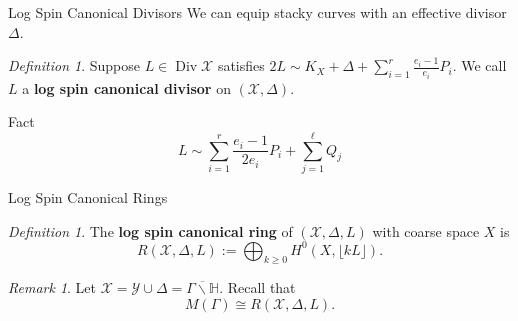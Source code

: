 \documentclass{beamer}
\theoremstyle{remark}
\newtheorem{rem}[thm]{Remark}
\newtheorem{defn}[thm]{Definition}
\newcommand\BH{{\mathbb H}}
\newcommand\BQ{{\mathbb Q}}
\newcommand \sx{{\mathscr X}}
\newcommand \sy{{\mathscr Y}}
\DeclareMathOperator\di{Div}
\newcommand{\halfcan}{L}
\begin{document}
\begin{frame}{Log Spin Canonical Divisors}
We can equip stacky curves with an effective divisor $\Delta$.





\begin{defn}
Suppose $\halfcan \in \di
\sx$ satisfies $2 \halfcan \sim K_X + \Delta + \sum_{i = 1}^{r}
\frac{e_i - 1}{e_i} P_i$.  We call $\halfcan$ a
\textbf{log spin canonical divisor} on $(\sx, \Delta)$.
\end{defn}

\begin{block}{Fact}
\[
	\halfcan \sim \sum_{i = 1}^{r} \frac{e_i - 1}{2e_i} P_i
	+ \sum_{j = 1}^{\ell} Q_j
\]
\end{block}

\end{frame}


\begin{frame}{Log Spin Canonical Rings}




\begin{defn}
The {\bf log spin canonical ring} of $(\sx, \Delta, \halfcan)$ with
coarse space $X$ is
\[
	R(\sx, \Delta, \halfcan) := \bigoplus_{k \geq 0} H^0(X, \lfloor k
	\halfcan \rfloor).
\]
\end{defn}

\begin{rem}
Let $\sx = \sy \cup \Delta = \overline{\Gamma \backslash \BH}$.
Recall that
\[
	M(\Gamma) \cong R(\sx, \Delta, \halfcan).
\]
\end{rem}

\end{frame}
\end{document}
